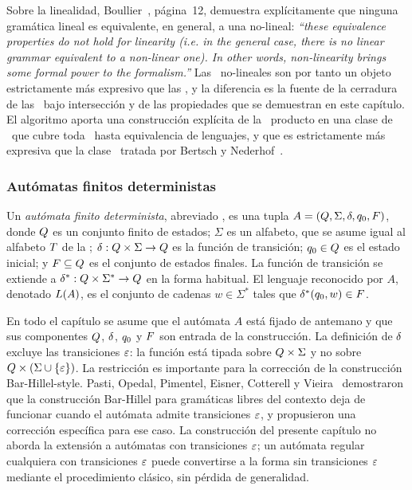 Sobre la linealidad, Boullier~\cite{REF}, página~12, demuestra explícitamente que ninguna gramática lineal es equivalente, en general, a una no-lineal: \emph{``these equivalence properties do not hold for linearity (i.e. in the general case, there is no linear grammar equivalent to a non-linear one). In other words, non-linearity brings some formal power to the formalism.''} Las \PRCG\ no-lineales son por tanto un objeto estrictamente más expresivo que las \sRCG, y la diferencia es la fuente de la cerradura de las \PRCG\ bajo intersección y de las propiedades que se demuestran en este capítulo. El algoritmo aporta una construcción explícita de la \PRCG\ producto en una clase de \PRCG\ que cubre toda \PRCG\ hasta equivalencia de lenguajes, y que es estrictamente más expresiva que la clase \sRCG\ tratada por Bertsch y Nederhof~\cite{REF}.

\subsubsection{Autómatas finitos deterministas}

Un \emph{autómata finito determinista}, abreviado \AFD, es una tupla $A = (Q, \Sigma, \delta, q_0, F)$, donde $Q$ es un conjunto finito de estados; $\Sigma$ es un alfabeto, que se asume igual al alfabeto $T$ de la \PRCG; $\delta : Q \times \Sigma \to Q$ es la función de transición; $q_0 \in Q$ es el estado inicial; y $F \subseteq Q$ es el conjunto de estados finales. La función de transición se extiende a $\delta^{*} : Q \times \Sigma^{*} \to Q$ en la forma habitual. El lenguaje reconocido por $A$, denotado $L(A)$, es el conjunto de cadenas $w \in \Sigma^{*}$ tales que $\delta^{*}(q_0, w) \in F$.

En todo el capítulo se asume que el autómata $A$ está fijado de antemano y que sus componentes $Q$, $\delta$, $q_0$ y $F$ son entrada de la construcción. La definición de $\delta$ excluye las transiciones $\varepsilon$: la función está tipada sobre $Q \times \Sigma$ y no sobre $Q \times (\Sigma \cup \{\varepsilon\})$. La restricción es importante para la corrección de la construcción Bar-Hillel-style. Pasti, Opedal, Pimentel, Eisner, Cotterell y Vieira~\cite{REF} demostraron que la construcción Bar-Hillel para gramáticas libres del contexto deja de funcionar cuando el autómata admite transiciones $\varepsilon$, y propusieron una corrección específica para ese caso. La construcción del presente capítulo no aborda la extensión a autómatas con transiciones $\varepsilon$; un autómata regular cualquiera con transiciones $\varepsilon$ puede convertirse a la forma sin transiciones $\varepsilon$ mediante el procedimiento clásico, sin pérdida de generalidad.

